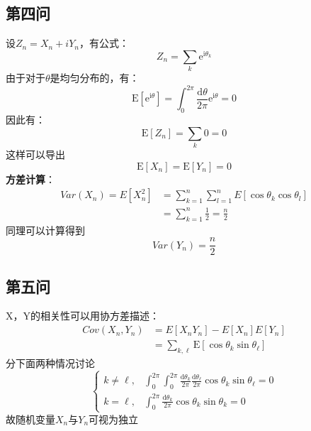 \documentclass[a4paper]{ctexart}
\begin{document}
\subsection{第四问}
设$Z_n=X_n+iY_n$，有公式：
\begin{equation}
Z_{n}=\sum_{k} \mathrm{e}^{\mathrm{i} \theta_{k}}
\end{equation}
由于对于$\theta$是均匀分布的，有：
\begin{equation}
\mathrm{E}\left[\mathrm{e}^{\mathrm{i} \theta}\right]=\int_{0}^{2 \pi} \frac{\mathrm{d} \theta}{2 \pi} \mathrm{e}^{\mathrm{i} \theta}=0
\end{equation}
因此有：
\begin{equation}
\mathrm{E}\left[Z_{n}\right]=\sum_{k} 0=0
\end{equation}
这样可以导出
\begin{equation}
\mathrm{E}\left[X_{n}\right]=\mathrm{E}\left[Y_{n}\right]=0
\end{equation}
\textbf{方差计算}：
\begin{equation}
\begin{aligned}
Var(X_n)=E[X_n^2]&=\sum_{k=1}^{n}\sum_{l=1}^{n} E[\cos \theta_{k} \cos \theta_{l}]\\
&=\sum_{k=1}^{n}\frac{1}{2}=\frac{n}{2}
\end{aligned}
\end{equation}
同理可以计算得到
\begin{equation}
Var(Y_n)=\frac{n}{2}
\end{equation}
\subsection{第五问}
X，Y的相关性可以用协方差描述：
\begin{equation}
\begin{aligned}
Cov(X_n,Y_n)&=E[X_nY_n]-E[X_n]E[Y_n]\\
&=\sum_{k, \ell} \mathrm{E}\left[\cos \theta_{k} \sin \theta_{\ell}\right]
\end{aligned}
\end{equation}
分下面两种情况讨论
\begin{equation}
\left\{
\begin{array}{ll}{k \neq \ell,} & {\int_{0}^{2 \pi} \int_{0}^{2 \pi} \frac{\mathrm{d} \theta_{k}}{2 \pi} \frac{\mathrm{d} \theta_{\ell}}{2 \pi} \cos \theta_{k} \sin \theta_{\ell}=0} \\ {k=\ell,} & {\int_{0}^{2 \pi} \frac{\mathrm{d} \theta_{k}}{2 \pi} \cos \theta_{k} \sin \theta_{k}=0}\end{array}\right.
\end{equation}
故随机变量$X_n$与$Y_n$可视为独立
\end{document}
